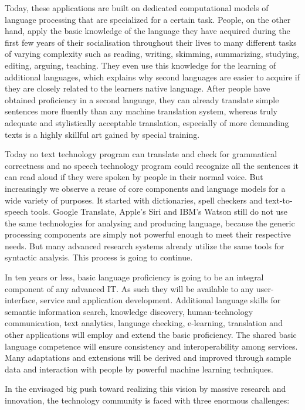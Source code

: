 \documentclass[10pt, plain]{../../metanetpaper}
\begin{document}
\begin{multicols}{2}
Today, these applications are built on dedicated computational models of language processing that are specialized for a certain task. People, on the other hand, apply the basic knowledge of the language they have acquired during the first few years of their socialisation throughout their lives to many different tasks of varying complexity such as reading, writing, skimming, summarizing, studying, editing, arguing, teaching. They even use this knowledge for the learning of additional languages, which explains why second languages are easier to acquire if they are closely related to the learners native language. After people have obtained proficiency in a second language, they can already translate simple sentences more fluently than any machine translation system, whereas truly adequate and stylistically acceptable translation, especially of more demanding texts is a highly skillful art gained by special training. 

Today no text technology program can translate and check for grammatical correctness and no speech technology program could recognize all the sentences it can read aloud if they were spoken by people in their normal voice. But increasingly we observe a reuse of core components and language models for a wide variety of purposes. It started with dictionaries, spell checkers and text-to-speech tools. Google Translate, Apple’s Siri and IBM’s Watson still do not use the same technologies for analysing and producing language, because the generic processing components are simply not powerful enough to meet their respective needs. But many advanced research systems already utilize the same tools for syntactic analysis. This process is going to continue.

In ten years or less, basic language proficiency is going to be an integral component of any advanced IT. As such they will be available to any user-interface, service and application development. Additional language skills for semantic information search, knowledge discovery, human-technology communication, text analytics, language checking, e-learning, translation and other applications will employ and extend the basic proficiency. The shared basic language competence will ensure consistency and interoperability among services.  Many adaptations and extensions will be derived and improved through sample data and interaction with people by powerful machine learning techniques.

In the envisaged big push toward realizing this vision by massive research and innovation, the technology community is faced with three enormous challenges:


\end{multicols}
\end{document}
